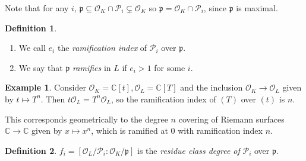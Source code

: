 \documentclass[11pt]{article}
\theoremstyle{definition}
\newtheorem{definition}{Definition}[subsection]
\newtheorem*{example}{Example}
\theoremstyle{plain}
\theoremstyle{remark}
\newcommand{\bC}{\mathbb{C}}
\newcommand{\cO}{\mathcal{O}}
\newcommand{\cP}{\mathcal{P}}
\newcommand{\fp}{\mathfrak{p}}
\begin{document}
Note that for any $i$, $\fp \subseteq \cO_K \cap \cP_i \subsetneq \cO_K$ so $\fp = \cO_K \cap \cP_i$, since $\fp$ is maximal.

\begin{definition}\phantom{}
    \begin{enumerate}
        \item We call $e_i$ the \emph{ramification index} of $\cP_i$ over $\fp$.
        \item We say that $\fp$ \emph{ramifies} in $L$ if $e_i > 1$ for some $i$.
    \end{enumerate}
\end{definition}

\begin{example}
    Consider $\cO_K = \bC[t], \cO_L = \bC[T]$ and the inclusion $\cO_K \to \cO_L$ given by $t \mapsto T^n$. Then $t \cO_L = T^n \cO_L$, so the ramification index of $(T)$ over $(t)$ is $n$.

    This corresponds geometrically to the degree $n$ covering of Riemann surfaces $\bC \to \bC$ given by $x \mapsto x^n$, which is ramified at $0$ with ramification index $n$.
\end{example}

\begin{definition}
    $f_i = [\cO_L / \cP_i : \cO_K / \fp]$ is the \emph{residue class degree of} $\cP_i$ over $\fp$.
\end{definition}
\end{document}
